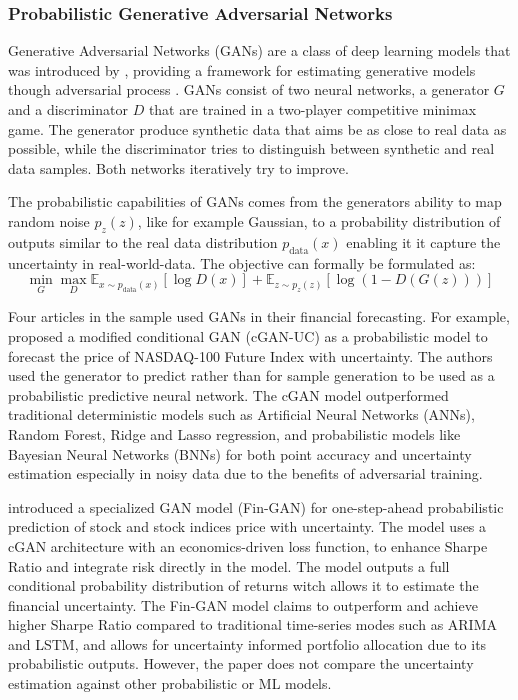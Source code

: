 \subsubsection{Probabilistic Generative Adversarial Networks}
Generative Adversarial Networks (GANs) are a class of deep learning models that was introduced by \textcite{goodfellow2014gan}, providing a framework for estimating generative models though adversarial process \parencite{goodfellow2014gan}. GANs consist of two neural networks, a generator $G$ and a discriminator $D$ that are trained in a two-player competitive minimax game.
The generator produce synthetic data that aims be as close to real data as possible, while the discriminator tries to distinguish between synthetic and real data samples. Both networks iteratively try to improve. 

The probabilistic capabilities of GANs comes from the generators ability to map random noise $p_z(z)$, like for example Gaussian, to a probability distribution of outputs similar to the real data distribution $p_{\text{data}}(x)$ enabling it it capture the uncertainty in real-world-data. The objective can formally be formulated as: 
\begin{equation}
\min_{G} \max_{D}  \mathbb{E}_{x \sim p_{\text{data}}(x)}[\log D(x)] + \mathbb{E}_{z \sim p_z(z)}[\log (1 - D(G(z)))]
\end{equation} 

Four articles in the sample used GANs in their financial forecasting. For example, \textcite{lee2021estimation} proposed a modified conditional GAN (cGAN-UC) as a probabilistic model to forecast the price of NASDAQ-100 Future Index with uncertainty. The authors used the generator to predict rather than for sample generation to be used as a probabilistic predictive neural network. The cGAN model outperformed traditional deterministic models such as Artificial Neural Networks (ANNs), Random Forest, Ridge and Lasso regression, and probabilistic models like Bayesian Neural Networks (BNNs) for both point accuracy and uncertainty estimation especially in noisy data due to the benefits of adversarial training. 

\textcite{vuletic2024finGAN} introduced a specialized GAN model (Fin-GAN) for one-step-ahead probabilistic prediction of stock and stock indices price with uncertainty. The model uses a cGAN architecture with an economics-driven loss function, to enhance Sharpe Ratio and integrate risk directly in the model. The model outputs a full conditional probability distribution of returns witch allows it to estimate the financial uncertainty. The Fin-GAN model claims to outperform and achieve higher Sharpe Ratio compared to traditional time-series modes such as ARIMA and LSTM, and allows for uncertainty informed portfolio allocation due to its probabilistic outputs. However, the paper does not compare the uncertainty estimation against other probabilistic or ML models. 

